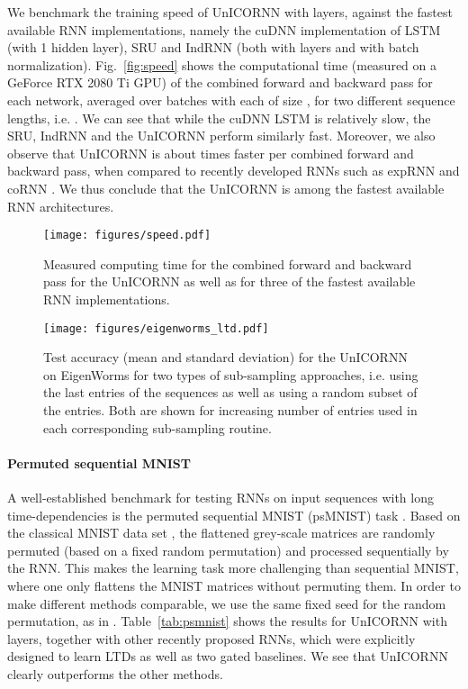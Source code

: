 \documentclass[a4paper]{article}
\newcommand{\fref}[1] {Fig.~\ref{#1}}
\newcommand{\Tref}[1]{Table~\ref{#1}}
\begin{document}
We benchmark the training speed of UnICORNN with  layers, against the fastest available RNN implementations, namely the cuDNN implementation \citep{cudnn_lstm} of LSTM (with 1 hidden layer), SRU and IndRNN (both with  layers and with batch normalization). \fref{fig:speed} shows the computational time (measured on a GeForce RTX 2080 Ti GPU) of the combined forward and backward pass for each network, averaged over  batches with each of size , for two different sequence lengths, i.e. . We can see that while the cuDNN LSTM is relatively slow, the SRU, IndRNN and the UnICORNN perform similarly fast. Moreover, we also observe that UnICORNN is about  times faster per combined forward and backward pass, when compared to recently developed RNNs such as expRNN \cite{exprnn} and coRNN \cite{coRNN}. We thus conclude that the UnICORNN is among the fastest available RNN architectures.
\begin{figure}[ht!]
\centering
\begin{minipage}[t]{0.49\textwidth}	
\texttt{[image: figures/speed.pdf]}
\caption{Measured computing time for the combined forward and backward pass for the UnICORNN as well as for three of the fastest available RNN implementations.}
\label{fig:speed}
\end{minipage}\hspace{0.01\textwidth}
\begin{minipage}[t]{.49\textwidth}
\texttt{[image: figures/eigenworms\_ltd.pdf]}
\caption{Test accuracy (mean and standard deviation) for the UnICORNN on EigenWorms for two types of sub-sampling approaches, i.e. using the last entries of the sequences as well as using a random subset of the entries. Both are shown for increasing number of entries used in each corresponding sub-sampling routine.}
\label{fig:worms}
\end{minipage}
\end{figure}
\paragraph{Permuted sequential MNIST}
A well-established benchmark for testing RNNs on input sequences with long time-dependencies is the permuted sequential MNIST (psMNIST) task \citep{seq_mnist}. Based on the classical MNIST data set \citep{mnist}, the flattened grey-scale matrices are randomly permuted (based on a fixed random permutation) and processed sequentially by the RNN. This makes the learning task more challenging than sequential MNIST, where one only flattens the MNIST matrices without permuting them. In order to make different methods comparable, we use the same fixed seed for the random permutation, as in \cite{exprnn,dtriv,scornn}. \Tref{tab:psmnist} shows the results for UnICORNN with  layers, together with other recently proposed RNNs, which were explicitly designed to learn LTDs as well as two gated baselines. We see that UnICORNN clearly outperforms the other methods.
\end{document}
